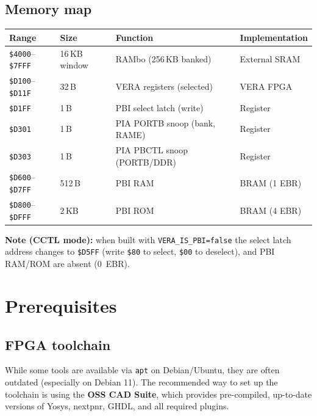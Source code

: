 \documentclass[11pt,a4paper]{article}
\newcommand{\cmd}[1]{\texttt{#1}}
\newcommand{\hex}[1]{\texttt{\$#1}}
\begin{document}
\subsection{Memory map}

\begin{center}
\begin{tabular}{llll}
\toprule
\textbf{Range} & \textbf{Size} & \textbf{Function} & \textbf{Implementation} \\
\midrule
\hex{4000}--\hex{7FFF} & 16\,KB window & RAMbo (256\,KB banked) & External SRAM \\
\hex{D100}--\hex{D11F} & 32\,B         & VERA registers (selected) & VERA FPGA \\
\hex{D1FF}            & 1\,B          & PBI select latch (write) & Register \\
\hex{D301}            & 1\,B          & PIA PORTB snoop (bank, RAME) & Register \\
\hex{D303}            & 1\,B          & PIA PBCTL snoop (PORTB/DDR)  & Register \\
\hex{D600}--\hex{D7FF} & 512\,B        & PBI RAM                & BRAM (1 EBR) \\
\hex{D800}--\hex{DFFF} & 2\,KB         & PBI ROM                & BRAM (4 EBR) \\
\bottomrule
\end{tabular}
\end{center}

\noindent\textbf{Note (CCTL mode):} when built with \cmd{VERA\_IS\_PBI=false}
the select latch address changes to \hex{D5FF} (write \texttt{\$80} to
select, \texttt{\$00} to deselect), and PBI RAM/ROM are absent (0~EBR\@).

\section{Prerequisites}

\subsection{FPGA toolchain}

While some tools are available via \cmd{apt} on Debian/Ubuntu, they are often outdated (especially on Debian 11). The recommended way to set up the toolchain is using the \textbf{OSS CAD Suite}, which provides pre-compiled, up-to-date versions of Yosys, nextpnr, GHDL, and all required plugins.
\end{document}
